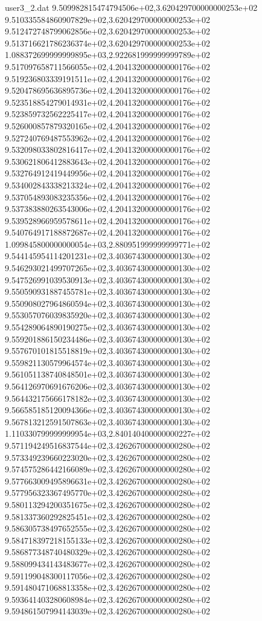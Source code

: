 \begin{filecontents}{user3_2.dat}
9.509982815474794506e+02,3.620429700000000253e+02
9.510335584860907829e+02,3.620429700000000253e+02
9.512472748799062856e+02,3.620429700000000253e+02
9.513716621786236374e+02,3.620429700000000253e+02
1.088372699999999895e+03,2.922681999999999789e+02
9.517097658711566055e+02,4.204132000000000176e+02
9.519236803339191511e+02,4.204132000000000176e+02
9.520478695636895736e+02,4.204132000000000176e+02
9.523518854279014931e+02,4.204132000000000176e+02
9.523859732562225417e+02,4.204132000000000176e+02
9.526000857879320165e+02,4.204132000000000176e+02
9.527240769487553962e+02,4.204132000000000176e+02
9.532098033802816417e+02,4.204132000000000176e+02
9.530621806412883643e+02,4.204132000000000176e+02
9.532764912419449956e+02,4.204132000000000176e+02
9.534002843338213324e+02,4.204132000000000176e+02
9.537054893083235356e+02,4.204132000000000176e+02
9.537383880263543006e+02,4.204132000000000176e+02
9.539528966959578611e+02,4.204132000000000176e+02
9.540764917188872687e+02,4.204132000000000176e+02
1.099845800000000054e+03,2.880951999999999771e+02
9.544145954114201231e+02,3.403674300000000130e+02
9.546293021499707265e+02,3.403674300000000130e+02
9.547526991039530913e+02,3.403674300000000130e+02
9.550590931887455781e+02,3.403674300000000130e+02
9.550908027964860594e+02,3.403674300000000130e+02
9.553057076039835920e+02,3.403674300000000130e+02
9.554289064890190275e+02,3.403674300000000130e+02
9.559201886150234486e+02,3.403674300000000130e+02
9.557670101815518819e+02,3.403674300000000130e+02
9.559821130579964574e+02,3.403674300000000130e+02
9.561051138740848501e+02,3.403674300000000130e+02
9.564126970691676206e+02,3.403674300000000130e+02
9.564432175666178182e+02,3.403674300000000130e+02
9.566585185120094366e+02,3.403674300000000130e+02
9.567813212591507863e+02,3.403674300000000130e+02
1.110330799999999954e+03,2.840140400000000227e+02
9.571194249516837544e+02,3.426267000000000280e+02
9.573349239660223020e+02,3.426267000000000280e+02
9.574575286442166089e+02,3.426267000000000280e+02
9.577663009495896631e+02,3.426267000000000280e+02
9.577956323367495770e+02,3.426267000000000280e+02
9.580113294200351675e+02,3.426267000000000280e+02
9.581337360292825451e+02,3.426267000000000280e+02
9.586305738497652555e+02,3.426267000000000280e+02
9.584718397218155133e+02,3.426267000000000280e+02
9.586877348740480329e+02,3.426267000000000280e+02
9.588099434143483677e+02,3.426267000000000280e+02
9.591199048300117056e+02,3.426267000000000280e+02
9.591480471068813358e+02,3.426267000000000280e+02
9.593641403280608984e+02,3.426267000000000280e+02
9.594861507994143039e+02,3.426267000000000280e+02

\end{filecontents}
